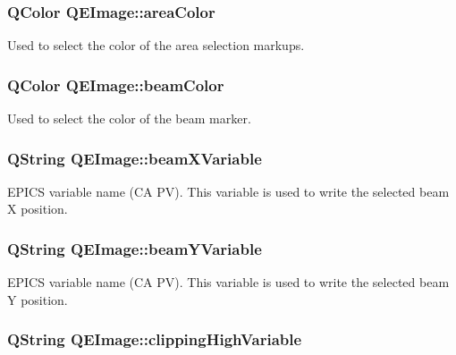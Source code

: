 \hypertarget{classQEImage_ad44e666dbc8ceadc207a25494be80762}{
\subsubsection[{areaColor}]{\setlength{\rightskip}{0pt plus 5cm}QColor QEImage::areaColor}}
\label{classQEImage_ad44e666dbc8ceadc207a25494be80762}
Used to select the color of the area selection markups. \hypertarget{classQEImage_ae69b7be04428ccdad5dffceae756f98f}{
\subsubsection[{beamColor}]{\setlength{\rightskip}{0pt plus 5cm}QColor QEImage::beamColor}}
\label{classQEImage_ae69b7be04428ccdad5dffceae756f98f}
Used to select the color of the beam marker. \hypertarget{classQEImage_a14a97754a61ed1d4228004ad17b64043}{
\subsubsection[{beamXVariable}]{\setlength{\rightskip}{0pt plus 5cm}QString QEImage::beamXVariable}}
\label{classQEImage_a14a97754a61ed1d4228004ad17b64043}
EPICS variable name (CA PV). This variable is used to write the selected beam X position. \hypertarget{classQEImage_a3a264cf7ff6d4068ca7151f979a1f2c9}{
\subsubsection[{beamYVariable}]{\setlength{\rightskip}{0pt plus 5cm}QString QEImage::beamYVariable}}
\label{classQEImage_a3a264cf7ff6d4068ca7151f979a1f2c9}
EPICS variable name (CA PV). This variable is used to write the selected beam Y position. \hypertarget{classQEImage_ac0aa101dc9f8ffdd2a39b4812372573b}{
\subsubsection[{clippingHighVariable}]{\setlength{\rightskip}{0pt plus 5cm}QString QEImage::clippingHighVariable}}
